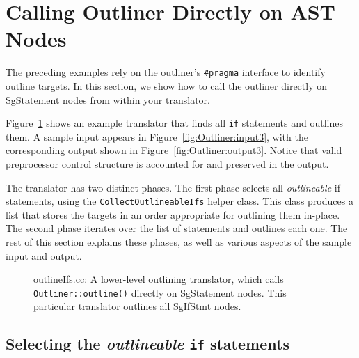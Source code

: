 \section{Calling Outliner Directly on AST Nodes}
\label{sec:Outliner:direct}

The preceding examples rely on the outliner's \texttt{\#pragma}
interface to identify outline targets. In this section, we show how
to call the outliner directly on SgStatement nodes from within your
translator.

Figure~\ref{fig:Outliner:direct} shows an example translator that
finds all \texttt{if} statements and outlines them. A sample input
appears in Figure~\ref{fig:Outliner:input3}, with the corresponding
output shown in Figure~\ref{fig:Outliner:output3}. Notice that
valid preprocessor control structure is accounted for and preserved in
the output.

The translator has two distinct phases. The first phase selects all
\emph{outlineable} if-statements, using the
\texttt{CollectOutlineableIfs} helper class. This class produces a
list that stores the targets in an order appropriate for outlining
them in-place. The second phase iterates over the list of statements
and outlines each one. The rest of this section explains these phases,
as well as various aspects of the sample input and output.

\begin{figure}[!h]
{\indent
{\mySmallFontSize
\begin{latexonly}
   
\end{latexonly}
\begin{htmlonly}
   
\end{htmlonly}

}
}
\caption{outlineIfs.cc: A lower-level outlining translator, which
calls \texttt{Outliner::outline()} directly on SgStatement
nodes. This particular translator outlines all SgIfStmt nodes.}
\label{fig:Outliner:direct}
\end{figure}

\subsection{Selecting the \emph{outlineable} \texttt{if} statements}
\label{sec:Outliner:direct:translator}

